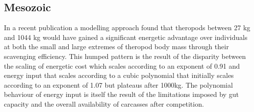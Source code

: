 \documentclass[a4paper,12pt]{article}
\begin{document}




\subsection*{Mesozoic}
In a recent publication a modelling approach found that theropods between 27 kg and 1044 kg would have gained a significant energetic advantage over individuals at both the small and large extremes of theropod body mass through their scavenging efficiency. 
This humped pattern is the result of the disparity between the scaling of energetic cost which scales according to an exponent of 0.91 and energy input that scales according to a cubic polynomial that initially scales according to an exponent of 1.07 but plateaus after 1000kg. 
The polynomial behaviour of energy input is itself the result of the limitations imposed by gut capacity and the overall availability of carcasses after competition.
\end{document}
